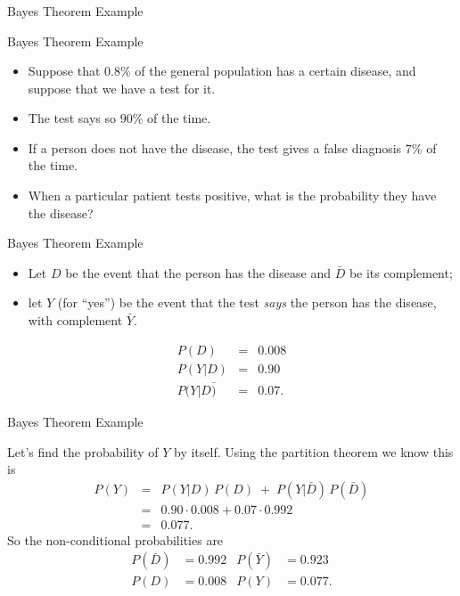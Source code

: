
\begin{frame}[fragile]\frametitle{}
\begin{center}
{\Large Bayes Theorem Example}
\end{center}
\end{frame}


\begin{frame}{Bayes Theorem  Example }

\begin{itemize}
\item  Suppose that $0.8\%$ of the general population has a certain disease, and suppose that we have a test for it.
\item The test says so $90\%$ of the time. 
\item If a person does not have the disease, the test gives a false diagnosis $7\%$ of the time. 
\item When a particular patient tests positive, what is the probability they have the disease?
\end{itemize}
\end{frame}

\begin{frame}{Bayes Theorem  Example }

\begin{itemize}
\item   Let $D$ be the event that the person has the disease and $\bar{D}$ be its complement;
\item let $Y$ (for ``yes'') be the event that the test \emph{says} the person has the disease, with complement $\bar{Y}$.
\end{itemize}
\begin{eqnarray*}
	P(D)       &=& 0.008 \\
	P(Y|D)     &=& 0.90 \\
	P(Y|D\bar) &=& 0.07.
\end{eqnarray*}
\end{frame}

\begin{frame}{Bayes Theorem  Example }

Let's find the probability
of $Y$ by itself.  Using the partition theorem we know this is
\begin{eqnarray*}
	P(Y) &=& P(Y|D)\,P(D) \;+\; P(Y|\bar{D})\,P(\bar{D}) \\
	&=& 0.90 \cdot 0.008 + 0.07\cdot 0.992 \\
	&=& 0.077.
\end{eqnarray*}
So the non-conditional probabilities are
\begin{align*}
	P(\bar{D})  &= 0.992  & P(\bar{Y})  &= 0.923 \\
	P(D)      &= 0.008  & P(Y)      &= 0.077.
\end{align*}
\end{frame}

